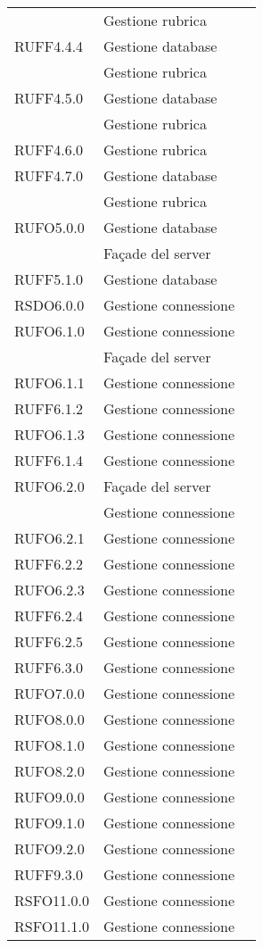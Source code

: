 \begin{center}
\begin{longtable}{lp{}l}
 & Gestione rubrica \\
RUFF4.4.4 & Gestione database \\
 & Gestione rubrica \\
RUFF4.5.0 & Gestione database \\
 & Gestione rubrica \\
RUFF4.6.0 & Gestione rubrica \\
RUFF4.7.0 & Gestione database \\
 & Gestione rubrica \\
RUFO5.0.0 & Gestione database \\
 & Façade del server \\
RUFF5.1.0 & Gestione database \\
RSDO6.0.0 & Gestione connessione \\
RUFO6.1.0 & Gestione connessione \\
 & Façade del server \\
RUFO6.1.1 & Gestione connessione \\
RUFF6.1.2 & Gestione connessione \\
RUFO6.1.3 & Gestione connessione \\
RUFF6.1.4 & Gestione connessione \\
RUFO6.2.0 & Façade del server \\
 & Gestione connessione \\
RUFO6.2.1 & Gestione connessione \\
RUFF6.2.2 & Gestione connessione \\
RUFO6.2.3 & Gestione connessione \\
RUFF6.2.4 & Gestione connessione \\
RUFF6.2.5 & Gestione connessione \\
RUFF6.3.0 & Gestione connessione \\
RUFO7.0.0 & Gestione connessione \\
RUFO8.0.0 & Gestione connessione \\
RUFO8.1.0 & Gestione connessione \\
RUFO8.2.0 & Gestione connessione \\
RUFO9.0.0 & Gestione connessione \\
RUFO9.1.0 & Gestione connessione \\
RUFO9.2.0 & Gestione connessione \\
RUFF9.3.0 & Gestione connessione \\
RSFO11.0.0 & Gestione connessione \\
RSFO11.1.0 & Gestione connessione \\

\end{longtable}
\end{center}
